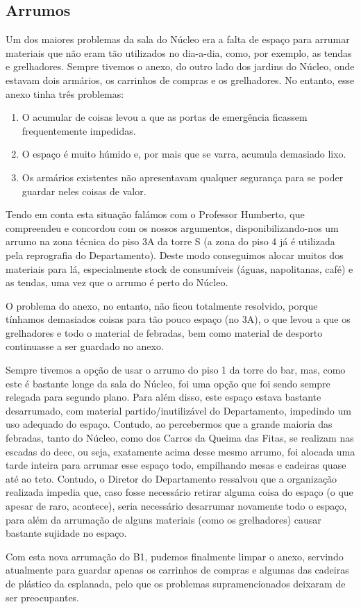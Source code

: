 
\subsection{Arrumos}

Um dos maiores problemas da sala do Núcleo era a falta de espaço para arrumar materiais que não eram tão utilizados no dia-a-dia, como, por exemplo, as tendas e grelhadores. Sempre tivemos o anexo, do outro lado dos jardins do Núcleo, onde estavam dois armários, os carrinhos de compras e os grelhadores. No entanto, esse anexo tinha três problemas:
\begin{enumerate}
\item O acumular de coisas levou a que as portas de emergência ficassem frequentemente impedidas.
\item O espaço é muito húmido e, por mais que se varra, acumula demasiado lixo.
\item Os armários existentes não apresentavam qualquer segurança para se poder guardar neles coisas de valor.
\end{enumerate}

Tendo em conta esta situação falámos com o Professor Humberto, que compreendeu e concordou com os nossos argumentos, disponibilizando-nos um arrumo na zona técnica do piso 3A da torre S (a zona do piso 4 já é utilizada pela reprografia do Departamento). Deste modo conseguimos alocar muitos dos materiais para lá, especialmente stock de consumíveis (águas, napolitanas, café) e as tendas, uma vez que o arrumo é perto do Núcleo.

O problema do anexo, no entanto, não ficou totalmente resolvido, porque tínhamos demasiados coisas para tão pouco espaço (no 3A), o que levou a que os grelhadores e todo o material de febradas, bem como material de desporto continuasse a ser guardado no anexo.

Sempre tivemos a opção de usar o arrumo do piso 1 da torre do bar, mas, como este é bastante longe da sala do Núcleo, foi uma opção que foi sendo sempre relegada para segundo plano. Para além disso, este espaço estava bastante desarrumado, com material partido/inutilizável do Departamento, impedindo um uso adequado do espaço. Contudo, ao percebermos que a grande maioria das febradas, tanto do Núcleo, como dos Carros da Queima das Fitas, se realizam nas escadas do \acrshort{deec}, ou seja, exatamente acima desse mesmo arrumo, foi alocada uma tarde inteira para arrumar esse espaço todo, empilhando mesas e cadeiras quase até ao teto. Contudo, o Diretor do Departamento ressalvou que a organização realizada impedia que, caso fosse necessário retirar alguma coisa do espaço (o que apesar de raro, acontece), seria necessário desarrumar novamente todo o espaço, para além da arrumação de alguns materiais (como os grelhadores) causar bastante sujidade no espaço.

Com esta nova arrumação do B1, pudemos finalmente limpar o anexo, servindo atualmente para guardar apenas os carrinhos de compras e algumas das cadeiras de plástico da esplanada, pelo que os problemas supramencionados deixaram de ser preocupantes.